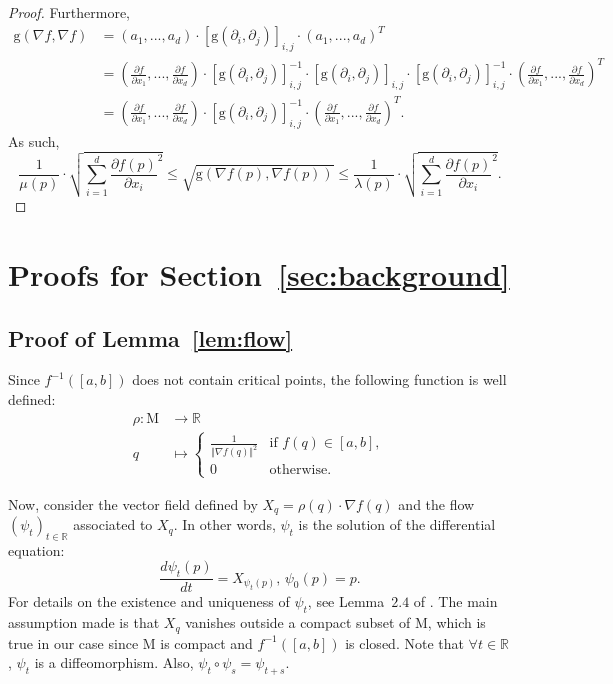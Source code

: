 \documentclass[pdflatex,sn-mathphys-ay]{sn-jnl}%
\newcommand{\man}{\mathrm{M}}
\newcommand{\g}{\mathrm{g}}
\newcommand{\R}{\mathbb{R}}
\newcommand{\preim}[2]{#1^{-1}(#2)}
\newcommand{\change}[1]{\noindent #1}
\theoremstyle{thmstyleone}%
\begin{document}
\begin{appendices}
\begin{proof}
Furthermore,
\begin{align*}
\g\left(\nabla f,\nabla f\right)&=(a_1,...,a_d)\cdot\left[\g(\partial_i,\partial_j)\right]_{i,j}\cdot(a_1,...,a_d)^T\\
&=\left(\frac{\partial f}{\partial x_1},...,\frac{\partial f}{\partial x_d}\right)\cdot\left[\g(\partial_i,\partial_j)\right]_{i,j}^{-1}\cdot\left[\g(\partial_i,\partial_j)\right]_{i,j}\cdot \left[\g(\partial_i,\partial_j)\right]_{i,j}^{-1}\cdot \left(\frac{\partial f}{\partial x_1},...,\frac{\partial f}{\partial x_d}\right)^T\\
&=\left(\frac{\partial f}{\partial x_1},...,\frac{\partial f}{\partial x_d}\right)\cdot \left[\g(\partial_i,\partial_j)\right]_{i,j}^{-1}\cdot \left(\frac{\partial f}{\partial x_1},...,\frac{\partial f}{\partial x_d}\right)^T.
\end{align*}
As such,
$$\frac{1}{\mu(p)}\cdot \sqrt{\sum_{i=1}^d\frac{\partial f(p)}{\partial x_i}^2}\leq \sqrt{\g\left(\nabla f(p),\nabla f(p)\right)}\leq \frac{1}{\lambda(p)}\cdot \sqrt{\sum_{i=1}^d\frac{\partial f(p)}{\partial x_i}^2}.$$
\end{proof}

\section{Proofs for Section~\ref{sec:background}}\label{apdx:proofs}


\subsection{Proof of Lemma~\ref{lem:flow}}

Since $\preim{f}{[a,b]}$ does not contain critical points, the following function is well defined:
\change{\begin{align*}
\rho\colon\man  &\longrightarrow \R\\
q &\longmapsto \begin{cases}
\frac{1}{\Vert\nabla f(q)\Vert^2}& \text{if } f(q)\in [a,b],\\
0& \text{otherwise.}
\end{cases}
\end{align*}}


Now, consider the vector field defined by $X_q=\rho(q)\cdot\nabla f(q)$ and the flow $(\psi_t)_{t\in\R}$ associated to $X_q$. In other words, $\psi_t$ is the solution of the differential equation: 
$$\frac{d\psi_t(p)}{dt}=X_{\psi_t(p)},\,\psi_0(p)=p.$$
For details on the existence and uniqueness of $\psi_t$, see Lemma~$2.4$ of \citet{milnor1963morse}. The main assumption made is that $X_q$ vanishes outside a compact subset of $\man$, which is true in our case since $\man$ is compact and $\preim{f}{[a,b]}$ is closed. Note that $\forall t\in\R$, $\psi_t$ is a diffeomorphism. Also, $\psi_t\circ\psi_s=\psi_{t+s}$.


\end{appendices}
\end{document}
